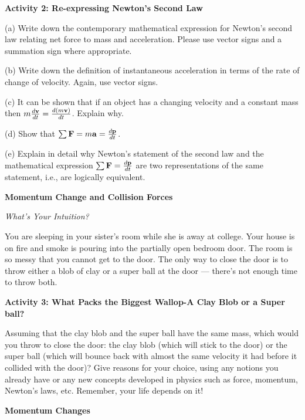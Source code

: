 \textbf{Activity 2: Re-expressing Newton's Second Law} 

(a) Write down the contemporary mathematical expression for Newton's second
law relating net force to mass and acceleration. Please use vector signs and
a summation sign where appropriate.
\vspace{10mm}

(b) Write down the definition of instantaneous acceleration in terms of the
rate of change of velocity. Again, use vector signs.
\vspace{10mm}

(c) It can be shown that if an object has a changing velocity and a constant
mass then \( m\frac{d{\bf v}}{dt}=\frac{d\left( m{\bf v}\right) }{dt} \).
Explain why.
\vspace{20mm}

(d) Show that \( \sum {\bf F}=m{\bf a}=\frac{d{\bf p}}{dt} \).
\vspace{20mm}

(e) Explain in detail why Newton's statement of the second law and the mathematical
expression \( \sum {\bf F}=\frac{d{\bf p}}{dt} \) are
two representations of the same statement, i.e., are logically equivalent.
\vspace{20mm}

\textbf{Momentum Change and Collision Forces} 

\textit{What's Your Intuition?} 

You are sleeping in your sister's room while she is away at college. Your house
is on fire and smoke is pouring into the partially open bedroom door. The room
is so messy that you cannot get to the door. The only way to close the door
is to throw either a blob of clay or a super ball at the door --- 
there's not enough
time to throw both.

\textbf{Activity 3: What Packs the Biggest Wallop-A Clay Blob or a Super ball? }

Assuming that the clay blob and the super ball have the same mass, which would
you throw to close the door: the clay blob (which will stick to the door) or
the super ball (which will bounce back with almost the same velocity it had
before it collided with the door)? Give reasons for your choice, using any notions
you already have or any new concepts developed in physics such as force, momentum,
Newton's laws, etc. Remember, your life depends on it!
\vspace{20mm}

\textbf{Momentum Changes} 

